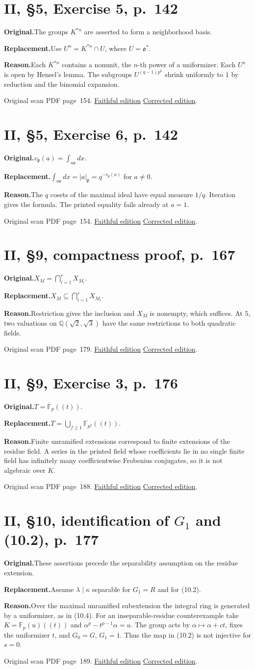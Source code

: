 \documentclass[11pt,a4paper]{article}
\newcommand{\original}{\par\smallskip\noindent\textbf{Original.}\enspace}
\newcommand{\replacement}{\par\smallskip\noindent\textbf{Replacement.}\enspace}
\newcommand{\reason}{\par\smallskip\noindent\textbf{Reason.}\enspace}
\newcommand{\editionlink}[3]{\href{#1\#errata.#2}{#3}}
\newcommand{\location}[2]{%
  \par\smallskip\noindent Original scan PDF page~#2.\enspace
  \editionlink{Neukirch_Faithful.pdf}{#1}{Faithful edition}
  \quad\editionlink{Neukirch_Corrected.pdf}{#1}{Corrected edition}.}
\begin{document}
\setcounter{section}{16}
\section{II, \S5, Exercise 5, p.~142}\label{errata:item:17}
\original The groups $K^{*n}$ are asserted to form a neighborhood basis.
\replacement Use $U^n=K^{*n}\cap U$, where $U=\mathfrak o^*$.
\reason Each $K^{*n}$ contains a nonunit, the $n$-th power of a uniformizer. Each $U^n$ is open by Hensel\textquoteright{}s lemma. The subgroups $U^{(q-1)p^k}$ shrink uniformly to $1$ by reduction and the binomial expansion.
\location{17}{154}

\setcounter{section}{17}
\section{II, \S5, Exercise 6, p.~142}\label{errata:item:18}
\original $v_{\mathfrak p}(a)=\int_{a\mathfrak o}dx$.
\replacement $\int_{a\mathfrak o}dx=|a|_{\mathfrak p}=q^{-v_{\mathfrak p}(a)}$ for $a\ne0$.
\reason The $q$ cosets of the maximal ideal have equal measure $1/q$. Iteration gives the formula. The printed equality fails already at $a=1$.
\location{18}{154}

\setcounter{section}{18}
\section{II, \S9, compactness proof, p.~167}\label{errata:item:19}
\original $X_M=\bigcap_{i=1}^r X_{M_i}$.
\replacement $X_M\subseteq\bigcap_{i=1}^r X_{M_i}$.
\reason Restriction gives the inclusion and $X_M$ is nonempty, which suffices. At $5$, two valuations on $\mathbb Q(\sqrt2,\sqrt3)$ have the same restrictions to both quadratic fields.
\location{19}{179}

\setcounter{section}{19}
\section{II, \S9, Exercise 3, p.~176}\label{errata:item:20}
\original $T=\overline{\mathbb F}_p((t))$.
\replacement $T=\bigcup_{f\ge1}\mathbb F_{p^f}((t))$.
\reason Finite unramified extensions correspond to finite extensions of the residue field. A series in the printed field whose coefficients lie in no single finite field has infinitely many coefficientwise Frobenius conjugates, so it is not algebraic over $K$.
\location{20}{188}

\setcounter{section}{20}
\section{II, \S10, identification of $G_1$ and (10.2), p.~177}\label{errata:item:21}
\original These assertions precede the separability assumption on the residue extension.
\replacement Assume $\lambda\mid\kappa$ separable for $G_1=R$ and for (10.2).
\reason Over the maximal unramified subextension the integral ring is generated by a uniformizer, as in (10.4). For an inseparable-residue counterexample take $K=\mathbb F_p(u)((t))$ and $\alpha^p-t^{p-1}\alpha=u$. The group acts by $\alpha\mapsto\alpha+ct$, fixes the uniformizer $t$, and $G_0=G$, $G_1=1$. Thus the map in (10.2) is not injective for $s=0$.
\location{21}{189}
\end{document}
